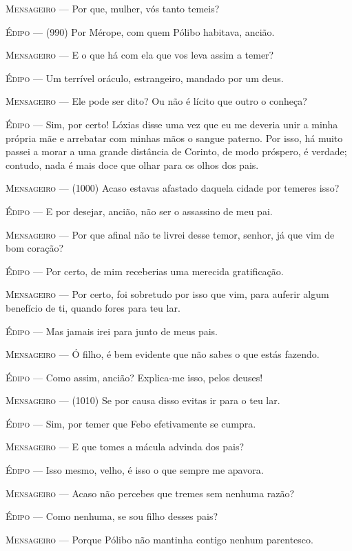 \textsc{Mensageiro} --- Por que, mulher, vós tanto temeis?

\textsc{Édipo} --- (990) Por Mérope, com quem Pólibo habitava, ancião.

\textsc{Mensageiro} --- E o que há com ela que vos leva assim a temer?

\textsc{Édipo} --- Um terrível oráculo, estrangeiro, mandado por um deus.

\textsc{Mensageiro} --- Ele pode ser dito? Ou não é lícito que outro o conheça?

\textsc{Édipo} --- Sim, por certo! Lóxias disse uma vez que eu me deveria unir a minha
própria mãe e arrebatar com minhas mãos o sangue paterno. Por isso, há
muito passei a morar a uma grande distância de Corinto, de modo
próspero, é verdade; contudo, nada é mais doce que olhar para os olhos
dos pais.

\textsc{Mensageiro} --- (1000) Acaso estavas afastado daquela cidade por temeres isso?

\textsc{Édipo} --- E por desejar, ancião, não ser o assassino de meu pai.

\textsc{Mensageiro} --- Por que afinal não te livrei desse temor, senhor, já que vim de bom
coração?

\textsc{Édipo} --- Por certo, de mim receberias uma merecida gratificação.

\textsc{Mensageiro} --- Por certo, foi sobretudo por isso que vim, para auferir algum benefício
de ti, quando fores para teu lar.

\textsc{Édipo} --- Mas jamais irei para junto de meus pais.

\textsc{Mensageiro} --- Ó filho, é bem evidente que não sabes o que estás fazendo.

\textsc{Édipo} --- Como assim, ancião? Explica-me isso, pelos deuses!

\textsc{Mensageiro} --- (1010) Se por causa disso evitas ir para o teu lar.

\textsc{Édipo} --- Sim, por temer que Febo efetivamente se cumpra.

\textsc{Mensageiro} --- E que tomes a mácula advinda dos pais?

\textsc{Édipo} --- Isso mesmo, velho, é isso o que sempre me apavora.

\textsc{Mensageiro} --- Acaso não percebes que tremes sem nenhuma razão?

\textsc{Édipo} --- Como nenhuma, se sou filho desses pais?

\textsc{Mensageiro} --- Porque Pólibo não mantinha contigo nenhum parentesco.

